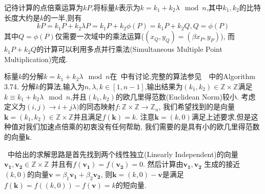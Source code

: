 \documentclass{article}
\newcommand{\Z}{\mathbb{Z}}
\begin{document}
记待计算的点倍乘运算为$kP$,将标量$k$表示为$k=k_1+k_2\lambda \mod n$,其中$k_1, k_2$的比特长度大约是$k$的一半,则有
$$kP = k_1P + k_2\lambda P = k_1P + k_2\phi(P) = k_1 P + k_2 Q, Q = \phi(P)$$
其中$Q=\phi(P)$仅需要一次域中的乘法运算($(x_Q, y_Q) = (\beta x_P, y_P)$),
而$k_1 P + k_2 Q$的计算可以利用多点并行乘法(Simultaneous Multiple Point Multiplication)完成.

标量$k$的分解$k=k_1+k_2\lambda \mod n$在~\cite{glv01}中有讨论,完整的算法参见~\cite{guidetoecc}~中的Algorithm 3.74.
分解$k$的算法,输入为$n, \lambda, k\in [1, n-1]$,输出结果为$(k_1, k_2) \in \Z \times \Z$满足
$k \equiv k_1 + k_2 \lambda \mod n$,并且$(k_1, k_2)$的欧几里得范数(Euclidean Norm)较小.
考虑定义为$(i,j) \rightarrow i + j\lambda)$的同态映射$f: \Z\times\Z \rightarrow \Z_n$,
我们希望找到的是向量$\mathbf{k}=(k_1, k_2)\in \Z\times\Z$并且满足$f(\mathbf{k})= k$.
注意$\mathbf{k} = (k, 0)$满足上述要求,但是这种值对我们加速点倍乘的初衷没有任何帮助,
我们需要的是具有小的欧几里得范数的向量$\mathbf{k}$.

~\cite{glv01}中给出的求解思路是首先找到两个线性独立(Linearly Independent)的向量$\mathbf{v_1}, \mathbf{v_2} \in \Z \times \Z$
并且有$f(\mathbf{v_1}) = f(\mathbf{v_2}) = 0$. 然后计算由$\mathbf{v_1}, \mathbf{v_2}$
生成的接近$(k,0)$的向量$\mathbf{v} = \beta_1\mathbf{v_1} + \beta_2\mathbf{v_2}$,
则$\mathbf{k} = (k,0) - \mathbf{v}$是满足$f(\mathbf{k}) = f((k,0)) - f(\mathbf{v}) = k$的短向量.
\end{document}

